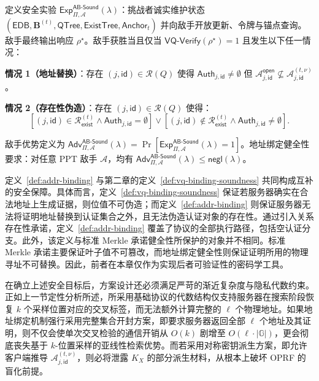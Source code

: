 \begin{definition}[地址绑定健全性]\label{def:addr-binding}
定义安全实验 $\mathsf{Exp}_{\Pi,\mathcal{A}}^{\mathsf{AB\text{-}Sound}}(\lambda)$：挑战者诚实维护状态 $(\mathsf{EDB},\mathbf{B}^{(t)},\mathsf{QTree},\mathsf{ExistTree},\mathsf{Anchor}_t)$ 并向敌手开放更新、令牌与锚点查询。敌手最终输出响应 $\rho^\star$。敌手获胜当且仅当 $\mathsf{VQ\text{-}Verify}(\rho^\star)=1$ 且发生以下任一情况：

\textbf{情况 1（地址替换）}：存在 $(j,\mathsf{id})\in\mathcal{R}(Q)$ 使得 $\mathsf{Auth}_{j,\mathsf{id}}\neq\emptyset$ 但 $\mathcal{A}_{j,\mathsf{id}}^{\mathsf{open}}\not\subseteq\mathcal{A}_{j,\mathsf{id}}^{(t,\nu)}$。

\textbf{情况 2（存在性伪造）}：存在 $(j,\mathsf{id})\in\mathcal{R}(Q)$ 使得：
\begin{equation}
\left[(j,\mathsf{id})\in\mathcal{R}_{\mathsf{exist}}^{(t)} \land \mathsf{Auth}_{j,\mathsf{id}}=\emptyset\right] \lor \left[(j,\mathsf{id})\notin\mathcal{R}_{\mathsf{exist}}^{(t)} \land \mathsf{Auth}_{j,\mathsf{id}}\neq\emptyset\right].
\end{equation}

敌手优势定义为 $\mathsf{Adv}_{\Pi,\mathcal{A}}^{\mathsf{AB\text{-}Sound}}(\lambda)=\Pr[\mathsf{Exp}_{\Pi,\mathcal{A}}^{\mathsf{AB\text{-}Sound}}(\lambda)=1]$。地址绑定健全性要求：对任意 PPT 敌手 $\mathcal{A}$，均有 $\mathsf{Adv}_{\Pi,\mathcal{A}}^{\mathsf{AB\text{-}Sound}}(\lambda)\le\mathsf{negl}(\lambda)$。
\end{definition}

定义~\ref{def:addr-binding} 与第二章的定义~\ref{def:vq-binding-soundness} 共同构成互补的安全保障。具体而言，定义~\ref{def:vq-binding-soundness} 保证若服务器确实在合法地址上生成证据，则位值不可伪造；而定义~\ref{def:addr-binding} 则保证服务器无法将证明地址替换到认证集合之外，且无法伪造认证对象的存在性。通过引入关系存在性承诺，定义~\ref{def:addr-binding} 覆盖了协议的全部执行路径，包括空认证分支。此外，该定义与标准 Merkle 承诺健全性所保护的对象并不相同。标准 Merkle 承诺主要保证叶子值不可篡改，而地址绑定健全性则保证证明所用的物理寻址不可替换。因此，前者在本章仅作为实现后者可验证性的密码学工具。

在确立上述安全目标后，方案设计还必须满足严苛的渐近复杂度与隐私代数约束。正如上一节定性分析所述，所采用基础协议的代数结构仅支持服务器在搜索阶段恢复 $k$ 个采样位置对应的交叉标签，而无法额外计算完整的 $\ell$ 个物理地址。如果地址绑定机制强行采用完整集合开封方案，即要求服务器返回全部 $\ell$ 个地址及其证明，则不仅会使单次交叉检验的通信开销从 $O(k)$ 剧增至 $O(\ell\cdot|\mathbb{G}|)$，更会彻底丧失基于 $k$-位置采样的亚线性检索优势。而若采用对称密钥派生方案，即允许客户端推导 $\mathcal{A}_{j,\mathsf{id}}^{(t,\nu)}$，则必将泄露 $K_X$ 的部分派生材料，从根本上破坏 OPRF 的盲化前提。

